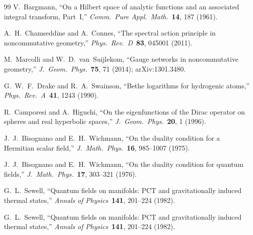 \documentclass[11pt]{article}
\begin{document}
\begin{thebibliography}{99}
V.~Bargmann, ``On a Hilbert space of analytic functions and an
associated integral transform, Part~I,'' \textit{Comm.\ Pure Appl.\
Math.}\ \textbf{14}, 187 (1961).

A.~H.~Chamseddine and A.~Connes, ``The spectral action principle in
noncommutative geometry,'' \textit{Phys.\ Rev.\ D}\ \textbf{83},
045001 (2011).

M.~Marcolli and W.~D.~van~Suijlekom, ``Gauge networks in
noncommutative geometry,'' \textit{J.\ Geom.\ Phys.}\ \textbf{75},
71 (2014); arXiv:1301.3480.

G.~W.~F.~Drake and R.~A.~Swainson, ``Bethe logarithms for hydrogenic
atoms,'' \textit{Phys.\ Rev.\ A}\ \textbf{41}, 1243 (1990).

R.~Camporesi and A.~Higuchi, ``On the eigenfunctions of the Dirac
operator on spheres and real hyperbolic spaces,''
\textit{J.\ Geom.\ Phys.}\ \textbf{20}, 1 (1996).


J.~J.~Bisognano and E.~H.~Wichmann, ``On the duality condition for a
Hermitian scalar field,'' \textit{J.\ Math.\ Phys.}\ \textbf{16},
985--1007 (1975).

J.~J.~Bisognano and E.~H.~Wichmann, ``On the duality condition for
quantum fields,'' \textit{J.\ Math.\ Phys.}\ \textbf{17},
303--321 (1976).

G.~L.~Sewell, ``Quantum fields on manifolds: PCT and gravitationally
induced thermal states,'' \textit{Annals of Physics}\ \textbf{141},
201--224 (1982).

G.~L.~Sewell, ``Quantum fields on manifolds: PCT and gravitationally
induced thermal states,'' \textit{Annals of Physics}\ \textbf{141},
201--224 (1982).


\end{thebibliography}
\end{document}
